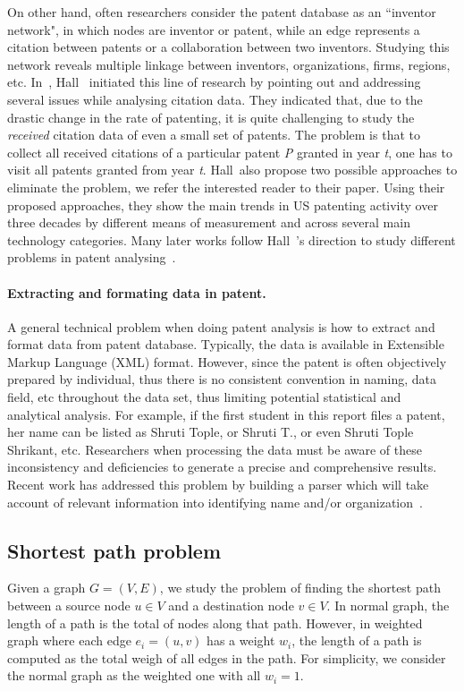 On other hand, often researchers consider the patent database as
an ``inventor network", in which nodes are inventor or patent, while an edge
represents a citation between patents or a collaboration between two inventors.
Studying this network reveals multiple linkage between inventors,
organizations, firms, regions, etc. In~\cite{Hall01thenber}, Hall~\etal
initiated this line of research by pointing out and addressing several issues
while analysing citation data. They indicated that, due to the drastic change
in the rate of patenting, it is quite challenging to study the {\em received}
citation data of even a small set of patents. The problem is that to collect
all received citations of a particular patent {\em P} granted in year {\em t},
one has to visit all patents granted from year {\em t}. Hall~\etal also propose
two possible approaches to eliminate the problem, we refer the interested
reader to their paper. Using their proposed approaches, they show the main
trends in US patenting activity over three decades by different means of
measurement and across several main technology categories. Many later works
follow Hall~\etal's direction to study different problems in patent
analysing~\cite{Leskovec:2005, Hall2000, leskovec2007graph, Acs2002}.

\paragraph{Extracting and formating data in patent.} A general technical problem
when doing patent analysis is how to extract and format data from patent
database. Typically, the data is available in Extensible Markup Language (XML)
format. However, since the patent is often objectively prepared by individual,
thus there is no consistent convention in naming, data field, etc throughout
the data set, thus limiting potential statistical and analytical analysis. For example, if the first student in this report files a patent, her name can be listed as Shruti Tople, or Shruti T., or even Shruti Tople Shrikant, etc. Researchers when processing the data must be aware of these inconsistency and deficiencies to generate a precise and comprehensive results. Recent work has addressed this problem by building a parser which will take account of relevant information into identifying name and/or organization~\cite{formattingpatentdata, disambiguation, Torvik:2009}.
% 
\subsection{Shortest path problem}
Given a graph $G = (V, E)$, we study the problem of finding the shortest path between a source node $u \in V$ and a destination node $v \in V$. In normal graph, the length of a path is the total of nodes along that path. However, in weighted graph where each edge $e_i = (u, v)$ has a weight $w_i$, the length of a path is computed as the total weigh of all edges in the path. For simplicity, we consider the normal graph as the weighted one with all $w_i=1$.

